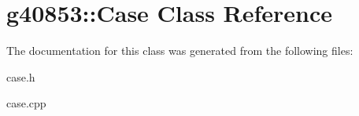 \hypertarget{classg40853_1_1_case}{}\section{g40853\+:\+:Case Class Reference}
\label{classg40853_1_1_case}


The documentation for this class was generated from the following files\+:\begin{DoxyCompactItemize}
\item 
case.\+h\item 
case.\+cpp\end{DoxyCompactItemize}
